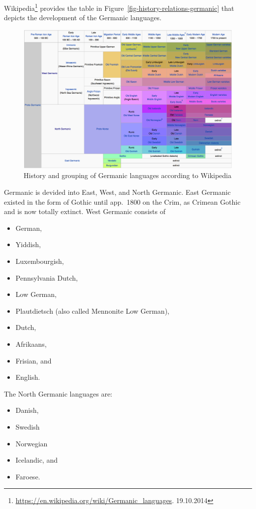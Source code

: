 Wikipedia\footnote{
\url{https://en.wikipedia.org/wiki/Germanic_languages}. 19.10.2014
} provides the table in Figure~\vref{fig-history-relations-germanic} that depicts the development of
the Germanic languages.
\begin{figure}
\begin{sideways}
\includegraphics[width=.9\textheight]{Pictures/germanic-wikipedia}
\end{sideways}
\caption{\label{fig-history-relations-germanic}History and grouping of Germanic languages according to Wikipedia}
\end{figure}
Germanic is devided into East, West, and North Germanic. East Germanic existed in the form of Gothic
until app.\ 1800 on the Crim, as Crimean Gothic and is now totally extinct. West Germanic consists
of 
\begin{itemize}
\item German, 
\item Yiddish, 
\item Luxembourgish, 
\item Pennsylvania Dutch, 
\item Low German, %
\item Plautdietsch (also called Mennonite Low German), %
\item Dutch, 
\item Afrikaans, 
\item Frisian, and 
\item English.
\end{itemize}
The North Germanic languages are:
\begin{itemize}
\item Danish,
\item Swedish
\item Norwegian
\item Icelandic, and 
\item Faroese.
\end{itemize}


